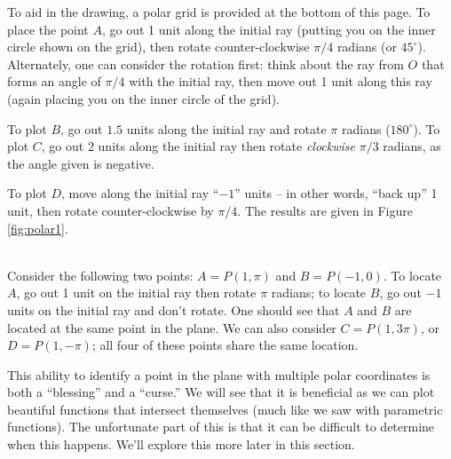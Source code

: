 {%
To aid in the drawing, a polar grid is provided at the bottom of this page. To place the point $A$, go out 1 unit along the initial ray (putting you on the inner circle shown on the grid), then rotate counter-clockwise $\pi/4$ radians (or $45^\circ$).  Alternately, one can consider the rotation first: think about the ray from $O$ that forms an angle of $\pi/4$ with the initial ray, then move out 1 unit along this ray (again placing you on the inner circle of the grid).

To plot $B$, go out $1.5$ units along the initial ray and rotate $\pi$ radians ($180^\circ$). To plot $C$, go out 2 units along the initial ray then rotate \textit{clockwise} $\pi/3$ radians, as the angle given is negative.

To plot $D$, move along the initial ray ``$-1$'' units -- in other words, ``back up'' 1 unit, then rotate counter-clockwise by $\pi/4$. The results are given in Figure \ref{fig:polar1}.
}\\

Consider the following two points: $A = P(1,\pi)$ and $B = P(-1,0)$. To locate $A$, go out 1 unit on the initial ray then rotate $\pi$ radians; to locate $B$, go out $-1$ units on the initial ray and don't rotate. One should see that $A$ and $B$ are located at the same point in the plane. We can also consider $C=P(1,3\pi)$, or $D = P(1,-\pi)$; all four of these points share the same location. 

This ability to identify a point in the plane with multiple polar coordinates is both a ``blessing'' and a ``curse.'' We will see that it is beneficial as we can plot beautiful functions that intersect themselves (much like we saw with parametric functions). The unfortunate part of this is that it can be difficult to determine when this happens. We'll explore this more later in this section.\\

